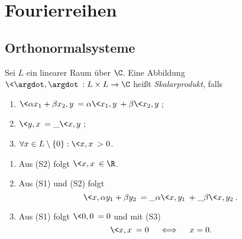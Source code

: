 
\chapter{Fourierreihen}

\section{Orthonormalsysteme}


\begin{df} \label{1.1}
	Sei $L$ ein linearer Raum über $\C$.
	Eine Abbildung $\<\argdot, \argdot\>: L \times L \to \C$ heißt \emph{Skalarprodukt}, falls
	\begin{enumerate}[(S1)]
		\item
			$\<\alpha x_1 + \beta x_2, y \> = \alpha \<x_1,y\> + \beta \<x_2, y\>$;
		\item
			$\<y,x\> = \_{\<x,y\>}$;
		\item
			$\forall x\in L\setminus \{0\} : \<x,x\> > 0$.
	\end{enumerate}
\end{df}

\begin{nt} \label{1.2}
	\begin{enumerate}[1)]
		\item
			Aus (S2) folgt $\<x,x\> \in \R$.
		\item
			Aus (S1) und (S2) folgt
			\[
				\<x, \alpha y_1 + \beta y_2\> = \_\alpha \<x,y_1\> + \_\beta \<x,y_2\>.
			\]
		\item
			Aus (S1) folgt $\<0,0\> = 0$ und mit (S3)
			\[
				\<x,x\> = 0 \quad\iff\quad x=0.
			\]
	\end{enumerate}
\end{nt}

